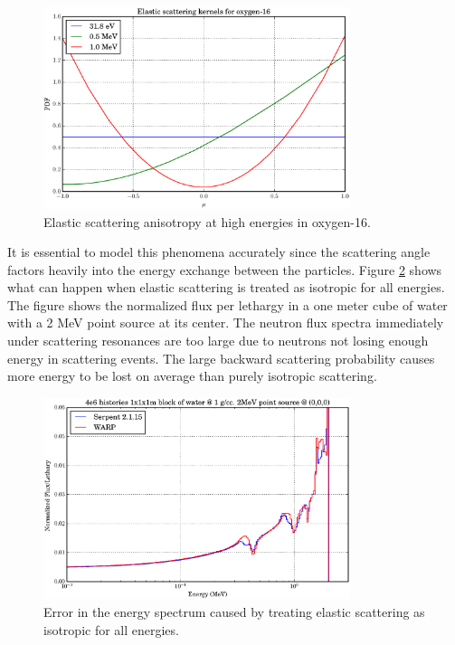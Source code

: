 \begin{figure}[h!] 
  \centering
    \includegraphics[width=0.8\textwidth]{graphics/scattering_anisotropy.eps}
     \caption{Elastic scattering anisotropy at high energies in oxygen-16.  \label{scattering_anisotropy}}
\end{figure}

It is essential to model this phenomena accurately since the scattering angle factors heavily into the energy exchange between the particles.  Figure \ref{scattering_error} shows what can happen when elastic scattering is treated as isotropic for all energies.  The figure shows the normalized flux per lethargy in a one meter cube of water with a 2 MeV point source at its center.  The neutron flux spectra immediately under scattering resonances are too large due to neutrons not losing enough energy in scattering events.  The large backward scattering probability causes more energy to be lost on average than purely isotropic scattering.

\begin{figure}[h!] 
  \centering
    \includegraphics[width=0.8\textwidth]{graphics/scattering_error.eps}
     \caption{Error in the energy spectrum caused by treating elastic scattering as isotropic for all energies.\label{scattering_error}}
\end{figure}


